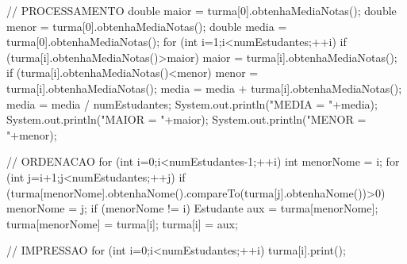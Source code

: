 \documentclass[onecolumn,a4paper,10pt]{report}
\newcommand{\+}{\, + \,}
\newcommand{\<}{\hspace*{-0.4cm}}
\begin{document}
\begin{enumerate}
{\begin{javacode}
{{        // PROCESSAMENTO
        double maior = turma[0].obtenhaMediaNotas();
        double menor = turma[0].obtenhaMediaNotas();
        double media = turma[0].obtenhaMediaNotas();
        for (int i=1;i<numEstudantes;++i) {
            if (turma[i].obtenhaMediaNotas()>maior)
                maior = turma[i].obtenhaMediaNotas();
            if (turma[i].obtenhaMediaNotas()<menor)
                menor = turma[i].obtenhaMediaNotas();
            media = media + turma[i].obtenhaMediaNotas();
        }
        media = media / numEstudantes;
        System.out.println("MEDIA = "+media);
        System.out.println("MAIOR = "+maior);
        System.out.println("MENOR = "+menor);
        
        // ORDENACAO
        for (int i=0;i<numEstudantes-1;++i) {
            int menorNome = i;
            for (int j=i+1;j<numEstudantes;++j) {
                if (turma[menorNome].obtenhaNome().compareTo(turma[j].obtenhaNome())>0)
                    menorNome = j;
            }
            if (menorNome != i) {
                Estudante aux = turma[menorNome];
                turma[menorNome] = turma[i];
                turma[i] = aux;
            }
        }
        
        // IMPRESSAO
        for (int i=0;i<numEstudantes;++i)
            turma[i].print();
    }
    
}
\end{javacode}
}
\newpage


\end{enumerate}
\end{document}
